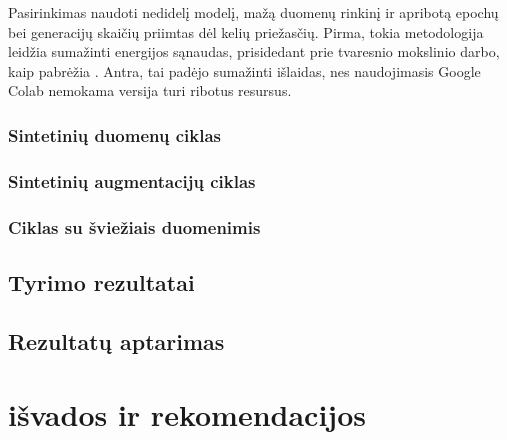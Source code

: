 \documentclass{VUMIFInfKursinis}
\begin{document}
Pasirinkimas naudoti nedidelį modelį, mažą duomenų rinkinį ir apribotą epochų bei generacijų skaičių priimtas dėl kelių priežasčių. Pirma, tokia metodologija leidžia sumažinti energijos sąnaudas, prisidedant prie tvaresnio mokslinio darbo, kaip pabrėžia \cite{energy_2019}. Antra, tai padėjo sumažinti išlaidas, nes naudojimasis Google Colab nemokama versija turi ribotus resursus.


\subsubsection{Sintetinių duomenų ciklas}
\subsubsection{Sintetinių augmentacijų ciklas}
\subsubsection{Ciklas su šviežiais duomenimis}

\subsection{Tyrimo rezultatai}
\subsection{Rezultatų aptarimas}







\section{išvados ir rekomendacijos}
\end{document}
